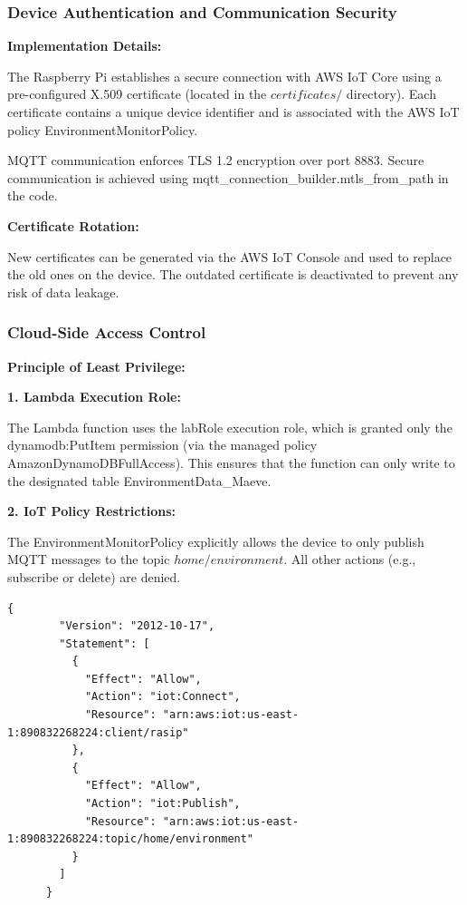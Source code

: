 \documentclass[12pt,a4paper]{article}
\begin{document}
\subsubsection{ Device Authentication and Communication Security}
\textbf{Implementation Details:}

\noindent
The Raspberry Pi establishes a secure connection with AWS IoT Core using a pre-configured X.509 certificate (located in the $certificates/$ directory). Each certificate contains a unique device identifier and is associated with the AWS IoT policy EnvironmentMonitorPolicy.

\noindent
MQTT communication enforces TLS 1.2 encryption over port 8883. Secure communication is achieved using mqtt\_connection\_builder.mtls\_from\_path in the code.

\vspace{\baselineskip}
\noindent
\textbf{Certificate Rotation:}

\noindent
New certificates can be generated via the AWS IoT Console and used to replace the old ones on the device. The outdated certificate is deactivated to prevent any risk of data leakage.

\subsubsection{ Cloud-Side Access Control}

\textbf{Principle of Least Privilege:}

\vspace{\baselineskip}
\noindent
\textbf{1. Lambda Execution Role:}

\noindent
The Lambda function uses the labRole execution role, which is granted only the dynamodb:PutItem permission (via the managed policy AmazonDynamoDBFullAccess). This ensures that the function can only write to the designated table EnvironmentData\_Maeve.

\vspace{\baselineskip}
\noindent
\textbf{2. IoT Policy Restrictions:}

\noindent
The EnvironmentMonitorPolicy explicitly allows the device to only publish MQTT messages to the topic $home/environment$. All other actions (e.g., subscribe or delete) are denied.

\begin{lstlisting}[language=jsonstyled,caption={Policy in Json},captionpos=b]
    {
        "Version": "2012-10-17",
        "Statement": [
          {
            "Effect": "Allow",
            "Action": "iot:Connect",
            "Resource": "arn:aws:iot:us-east-1:890832268224:client/rasip"
          },
          {
            "Effect": "Allow",
            "Action": "iot:Publish",
            "Resource": "arn:aws:iot:us-east-1:890832268224:topic/home/environment"
          }
        ]
      }
    \end{lstlisting}
\end{document}
